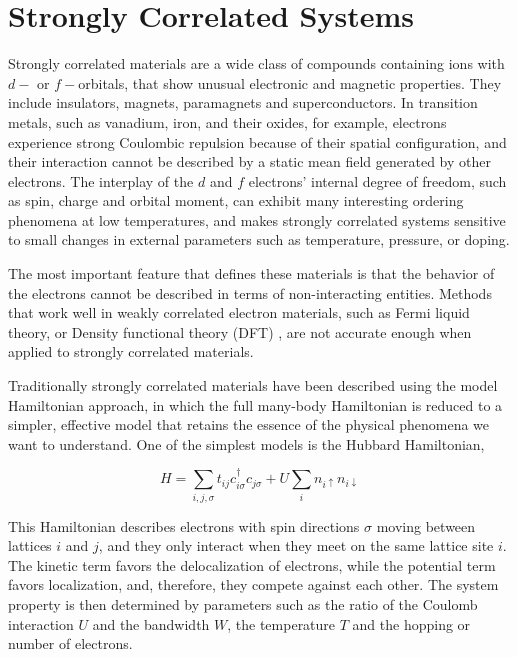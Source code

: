 \section{Strongly Correlated Systems}
Strongly correlated materials are a wide class of compounds containing ions 
with $d-$ or $f-$orbitals, that show unusual electronic and magnetic properties. 
They include insulators, magnets, paramagnets and superconductors. In transition
metals, such as vanadium, iron, and their oxides, for example, electrons experience
strong Coulombic repulsion because of their spatial configuration, and their 
interaction cannot be described by a static mean field generated by other electrons.
\cite{RevModPhys.56.99,RevModPhys.70.1039}
The interplay of the $d$ and $f$ electrons' internal degree of freedom, such as
spin, charge and orbital moment, can exhibit many interesting ordering phenomena
at low temperatures, and makes strongly correlated systems sensitive to small
changes in external parameters such as temperature, pressure, or doping. 

The most important feature that defines these materials is that the behavior of the electrons
cannot be described in terms of non-interacting entities. Methods that work well
in weakly correlated electron materials, such as Fermi liquid theory, or Density
functional theory (DFT) \cite{RevModPhys.61.689}, are not accurate enough when applied to strongly 
correlated materials. 

Traditionally strongly correlated materials have been described using the model Hamiltonian 
approach, in which the full many-body Hamiltonian is reduced to a simpler, effective
model that retains the essence of the physical phenomena we want to understand.
One of the simplest models is the Hubbard Hamiltonian, 

\begin{equation}
  \label{eq:13}
  H=\sum_{i,j,\sigma}t_{ij}c_{i\sigma}^\dagger c_{j\sigma} + U\sum_i n_{i\uparrow} n_{i\downarrow}
\end{equation}

This Hamiltonian describes electrons with spin directions $\sigma$ moving between 
lattices $i$ and $j$, and they only interact when they meet on the same lattice 
site $i$. The kinetic term favors the delocalization of electrons, while the 
potential term favors localization, and, therefore, they compete against each
other. The system property is then determined by parameters such as the ratio of
the Coulomb interaction $U$ and the bandwidth $W$, the temperature $T$ and the 
hopping or number of electrons. 

